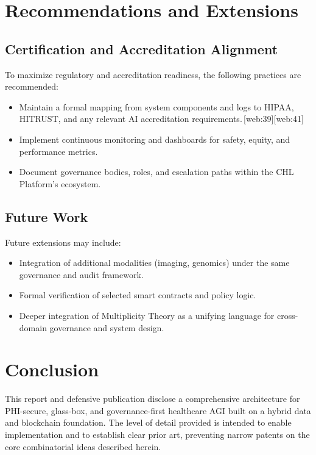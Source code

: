 \documentclass[11pt]{article}
\begin{document}
\section{Recommendations and Extensions}

\subsection{Certification and Accreditation Alignment}

To maximize regulatory and accreditation readiness, the following practices are recommended:
\begin{itemize}[nosep]
  \item Maintain a formal mapping from system components and logs to HIPAA, HITRUST, and any relevant AI accreditation requirements.\,[web:39][web:41]
  \item Implement continuous monitoring and dashboards for safety, equity, and performance metrics.
  \item Document governance bodies, roles, and escalation paths within the CHL Platform's ecosystem.
\end{itemize}

\subsection{Future Work}

Future extensions may include:
\begin{itemize}[nosep]
  \item Integration of additional modalities (imaging, genomics) under the same governance and audit framework.
  \item Formal verification of selected smart contracts and policy logic.
  \item Deeper integration of Multiplicity Theory as a unifying language for cross-domain governance and system design.
\end{itemize}

\section*{Conclusion}

This report and defensive publication disclose a comprehensive architecture for PHI-secure, glass-box, and governance-first healthcare AGI built on a hybrid data and blockchain foundation. 
The level of detail provided is intended to enable implementation and to establish clear prior art, preventing narrow patents on the core combinatorial ideas described herein.
\end{document}

